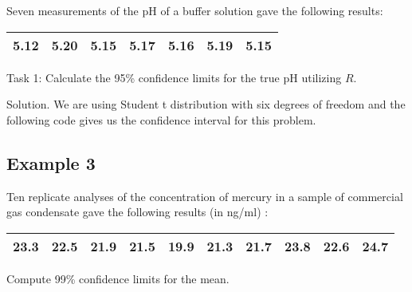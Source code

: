 Seven measurements of the pH of a buffer solution gave the
following results:

\begin{center}
	\begin{tabular}{|c|c|c|c|c|c|c|}
		\hline
		5.12 & 5.20 & 5.15 & 5.17 & 5.16 & 5.19 & 5.15\\
		\hline
	\end{tabular}
\end{center}


Task 1: Calculate the 95\% confidence limits for the true pH
utilizing $R$.


Solution. We are using Student t distribution with six degrees of
freedom and the following code gives us the confidence interval
for this problem.

\subsection{Example 3} Ten replicate analyses of the concentration
of mercury in a sample of commercial gas condensate gave the
following results (in ng/ml) :

\begin{center}
	\begin{tabular}{|c|c|c|c|c|c|c|c|c|c|}
		\hline
		23.3 & 22.5 & 21.9 & 21.5 & 19.9 & 21.3 & 21.7 & 23.8 & 22.6 &
		24.7\\
		\hline
	\end{tabular}
\end{center}

Compute 99\% confidence limits for the mean.


\newpage

